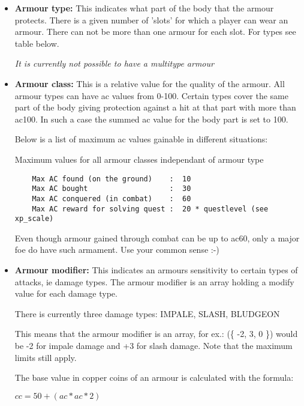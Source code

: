 \begin{itemize}
\item{\bf Armour type:}
            This indicates what part of the body that the armour
            protects. There is a given number of 'slots' for which
            a player can wear an armour. There can not be more than
            one armour for each slot. For types see table below.
        
            {\em It is currently not possible to have a multitype armour}

\item{\bf Armour class:}
            This is a relative value for the quality of the armour.
            All armour types can have ac values from 0-100. Certain
            types cover the same part of the body giving protection
            against a hit at that part with more than ac100. In such
            a case the summed ac value for the body part is set to
            100.
    
            Below is a list of maximum ac values gainable in different
            situations:

    Maximum values for all armour classes independant of armour type

\begin{verbatim}
    Max AC found (on the ground)    :  10
    Max AC bought                   :  30
    Max AC conquered (in combat)    :  60
    Max AC reward for solving quest :  20 * questlevel (see xp_scale)
\end{verbatim}

    Even though armour gained through combat can be up to ac60, only a
    major foe do have such armament. Use your common sense :-)

\item{\bf Armour modifier:}
            This indicates an armours sensitivity to certain types
            of attacks, ie damage types. The armour modifier is an
            array holding a modify value for each damage type.

            There is currently three damage types:
            IMPALE, SLASH, BLUDGEON

            This means that the armour modifier is an array, for ex.:
            (\{ -2, 3, 0 \}) would be -2 for impale damage and +3 for slash damage.
            Note that the maximum limits still apply.

The base value in copper coins of an armour is calculated with the formula:

            $cc = 50 + (ac * ac * 2)$


\end{itemize}

